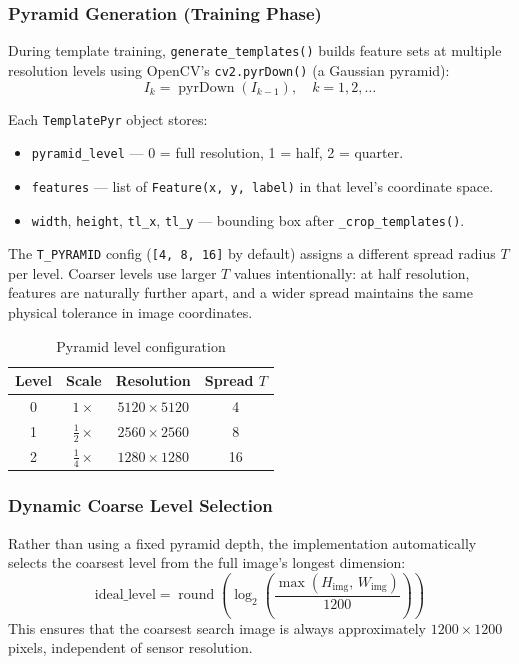 \documentclass[12pt,a4paper]{article}
\begin{document}
\subsubsection{Pyramid Generation (Training Phase)}
During template training, \texttt{generate\_templates()} builds feature sets at
multiple resolution levels using OpenCV's \texttt{cv2.pyrDown()} (a Gaussian pyramid):
\begin{equation}
  I_k = \operatorname{pyrDown}(I_{k-1}), \quad k = 1, 2, \ldots
\end{equation}

Each \texttt{TemplatePyr} object stores:
\begin{itemize}
  \item \texttt{pyramid\_level} --- 0 = full resolution, 1 = half, 2 = quarter.
  \item \texttt{features} --- list of \texttt{Feature(x, y, label)} in that level's
        coordinate space.
  \item \texttt{width}, \texttt{height}, \texttt{tl\_x}, \texttt{tl\_y} ---
        bounding box after \texttt{\_crop\_templates()}.
\end{itemize}

The \texttt{T\_PYRAMID} config (\texttt{[4, 8, 16]} by default) assigns a different
spread radius $T$ per level.  Coarser levels use larger $T$ values intentionally: at
half resolution, features are naturally further apart, and a wider spread maintains
the same physical tolerance in image coordinates.

\begin{table}[H]
  \centering
  \caption{Pyramid level configuration}
  \label{tab:pyramid}
  \begin{tabular}{cccc}
    \toprule
    \textbf{Level} & \textbf{Scale}      & \textbf{Resolution}      & \textbf{Spread $T$} \\
    \midrule
    0              & $1\times$           & $5120 \times 5120$       & 4                   \\
    1              & $\tfrac{1}{2}\times$& $2560 \times 2560$       & 8                   \\
    2              & $\tfrac{1}{4}\times$& $1280 \times 1280$       & 16                  \\
    \bottomrule
  \end{tabular}
\end{table}

\subsubsection{Dynamic Coarse Level Selection}
Rather than using a fixed pyramid depth, the implementation automatically selects
the coarsest level from the full image's longest dimension:
\begin{equation}
  \text{ideal\_level} = \operatorname{round}\!\left(\log_2\!\left(
    \frac{\max(H_\text{img},\, W_\text{img})}{1200}\right)\right)
\end{equation}
This ensures that the coarsest search image is always approximately
$1200 \times 1200$ pixels, independent of sensor resolution.
\end{document}
